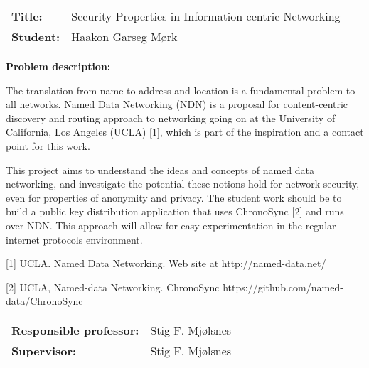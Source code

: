 \begin{titlingpage}

\noindent
\begin{tabular}{@{}p{4cm}l}
\textbf{Title:} 	& Security Properties in Information-centric Networking \\
\textbf{Student:}	& Haakon Garseg Mørk \\
\end{tabular}

\vspace{4ex}
\noindent\textbf{Problem description:}
\vspace{2ex}

The translation from name to address and location is a fundamental problem to all networks.
Named Data Networking (NDN) is a proposal for content-centric discovery and routing approach to networking
going on at the University of California, Los Angeles (UCLA) [1], which is part of the inspiration and a contact point for this work.

This project aims to understand the ideas and concepts of named data networking, and investigate the
potential these notions hold for network security, even for properties of anonymity and privacy. 
The student work should be to build a public key distribution application that uses ChronoSync [2] and runs over NDN.
This approach will allow for easy experimentation in the regular internet protocols environment.     

[1]  UCLA.  Named Data Networking. Web site at http://named-data.net/

[2]  UCLA, Named-data Networking. ChronoSync https://github.com/named-data/ChronoSync

\noindent
\begin{tabular}{@{}p{4cm}l}
\textbf{Responsible professor:} 	& Stig F. Mjølsnes \\
\textbf{Supervisor:}			& Stig F. Mjølsnes \\
\end{tabular}

\end{titlingpage}